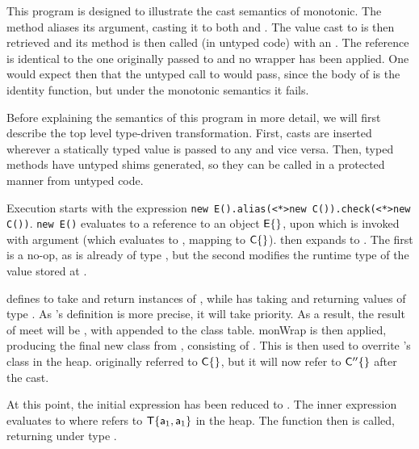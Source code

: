 \documentclass[sigconf]{acmart}
\newcommand{\code}[1]{{\tt #1}\xspace}
\begin{document}
This program is designed to illustrate the cast semantics of monotonic. The
method  aliases its argument, casting it to both \C and \D. The
value cast to \C is then retrieved and its method  is then called
(in untyped code) with an . The reference is identical to the one
originally passed to  and no wrapper has been applied. One would
expect then that the untyped call to  would pass, since the body
of  is the identity function, but under the monotonic semantics it
fails.

Before explaining the semantics of this program in more detail, we will first
describe the top level type-driven transformation. First, casts are inserted
wherever a statically typed value is passed to any and vice versa. Then, typed
methods have untyped shims generated, so they can be called in a protected
manner from untyped code. 

Execution starts with the expression \code{new E().alias(<*>new
C()).check(<*>new C())}. \code{new E()} evaluates to a reference \a to an
object ${\sf{E}}\{\}$, upon which  is invoked with argument \New\C{}
(which evaluates to \a[1], mapping to $\C\{\}$).  then expands to
\MonCast{}. The first
\MonCast\C\a[1] is a no-op, as \a[1] is already of type \C, but the second
\MonCast\D\a[1] modifies the runtime type of the value stored at \a[1].

\D defines  to take and return instances of , while \C  has
 taking and returning values of type \any. As \D's definition is
more precise, it will take priority. As a result, the result of meet will be
\Cp, with \Class{} appended to the
class table. monWrap is then applied, producing the final new class \Cpp from
\Cp, consisting of \Class{}. This is then used to overrite \a[1]'s class in the heap. \a[1] originally
referred to $\C\{\}$, but it will now refer to ${\sf{C''}}\{\}$ after the cast.

At this point, the initial expression has been reduced to
. The inner expression
\any\any evaluates to
\any\any where \a[2] refers to $\xt{T}\{\a[1],\a[1]\}$
in the heap. The  function then is called, returning \a[1] under type
\any.
\end{document}
